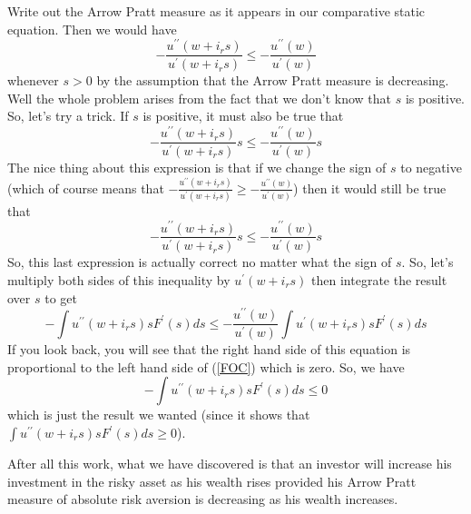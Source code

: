 \documentclass[12pt]{article}
\begin{document}
Write out the Arrow Pratt measure as it appears in our comparative static
equation. Then we would have%
\[
-\frac{u^{\prime\prime}\left(  w+i_{r}s\right)  }{u^{\prime}\left(
w+i_{r}s\right)  }\leq-\frac{u^{\prime\prime}\left(  w\right)  }{u^{\prime
}\left(  w\right)  }%
\]
whenever $s>0$ by the assumption that the Arrow Pratt measure is decreasing.
Well the whole problem arises from the fact that we don't know that $s$ is
positive. So, let's try a trick. If $s$ is positive, it must also be true that%
\[
-\frac{u^{\prime\prime}\left(  w+i_{r}s\right)  }{u^{\prime}\left(
w+i_{r}s\right)  }s\leq-\frac{u^{\prime\prime}\left(  w\right)  }{u^{\prime
}\left(  w\right)  }s
\]
The nice thing about this expression is that if we change the sign of $s$ to
negative (which of course means that $-\frac{u^{\prime\prime}\left(
w+i_{r}s\right)  }{u^{\prime}\left(  w+i_{r}s\right)  }\geq-\frac
{u^{\prime\prime}\left(  w\right)  }{u^{\prime}\left(  w\right)  }$) then it
would still be true that%
\[
-\frac{u^{\prime\prime}\left(  w+i_{r}s\right)  }{u^{\prime}\left(
w+i_{r}s\right)  }s\leq-\frac{u^{\prime\prime}\left(  w\right)  }{u^{\prime
}\left(  w\right)  }s
\]
So, this last expression is actually correct no matter what the sign of $s$. So,
let's multiply both sides of this inequality by $u^{\prime}\left(
w+i_{r}s\right)  $ then integrate the result over $s$ to get%
\[
-\int u^{\prime\prime}\left(  w+i_{r}s\right)  sF^{\prime}\left(  s\right)
ds\leq-\frac{u^{\prime\prime}\left(  w\right)  }{u^{\prime}\left(  w\right)
}\int u^{\prime}\left(  w+i_{r}s\right)  sF^{\prime}\left(  s\right)  ds
\]
If you look back, you will see that the right hand side of this equation is
proportional to the left hand side of (\ref{FOC}) which is zero. So, we have%
\[
-\int u^{\prime\prime}\left(  w+i_{r}s\right)  sF^{\prime}\left(  s\right)
ds\leq0
\]
which is just the result we wanted (since it shows that $\int u^{\prime\prime
}\left(  w+i_{r}s\right)  sF^{\prime}\left(  s\right)  ds\geq0$). 

After all this work, what we have discovered is that an investor will increase
his investment in the risky asset as his wealth rises provided his Arrow Pratt
measure of absolute risk aversion is decreasing as his wealth increases. 
\end{document}
